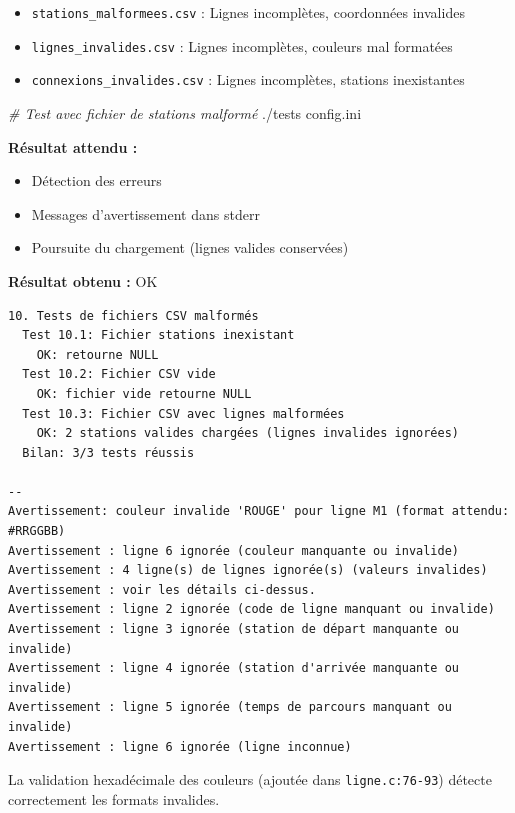\documentclass[
]{article}
\newcommand{\OK}{OK~\twemoji{white_check_mark}}
\newcommand{\OK}{OK~\twemoji{white_check_mark}}
\newenvironment{Shaded}{}{}
\newcommand{\CommentTok}[1]{\textcolor[rgb]{0.38,0.63,0.69}{\textit{#1}}}
\newcommand{\ExtensionTok}[1]{#1}
\newcommand{\NormalTok}[1]{#1}
\providecommand{\tightlist}{%
  \setlength{\itemsep}{0pt}\setlength{\parskip}{0pt}}
\begin{document}
\begin{itemize}
\tightlist
\item
  \texttt{stations\_malformees.csv} : Lignes incomplètes, coordonnées
  invalides
\item
  \texttt{lignes\_invalides.csv} : Lignes incomplètes, couleurs mal
  formatées
\item
  \texttt{connexions\_invalides.csv} : Lignes incomplètes, stations
  inexistantes
\end{itemize}

\begin{Shaded}
\begin{Highlighting}[]
\CommentTok{\# Test avec fichier de stations malformé}
\ExtensionTok{./tests}\NormalTok{ config.ini}
\end{Highlighting}
\end{Shaded}

\textbf{Résultat attendu :}

\begin{itemize}
\tightlist
\item
  Détection des erreurs
\item
  Messages d'avertissement dans stderr
\item
  Poursuite du chargement (lignes valides conservées)
\end{itemize}

\textbf{Résultat obtenu :} \OK

\begin{verbatim}
10. Tests de fichiers CSV malformés
  Test 10.1: Fichier stations inexistant
    OK: retourne NULL
  Test 10.2: Fichier CSV vide
    OK: fichier vide retourne NULL
  Test 10.3: Fichier CSV avec lignes malformées
    OK: 2 stations valides chargées (lignes invalides ignorées)
  Bilan: 3/3 tests réussis

--
Avertissement: couleur invalide 'ROUGE' pour ligne M1 (format attendu: #RRGGBB)
Avertissement : ligne 6 ignorée (couleur manquante ou invalide)
Avertissement : 4 ligne(s) de lignes ignorée(s) (valeurs invalides)
Avertissement : voir les détails ci-dessus.
Avertissement : ligne 2 ignorée (code de ligne manquant ou invalide)
Avertissement : ligne 3 ignorée (station de départ manquante ou invalide)
Avertissement : ligne 4 ignorée (station d'arrivée manquante ou invalide)
Avertissement : ligne 5 ignorée (temps de parcours manquant ou invalide)
Avertissement : ligne 6 ignorée (ligne inconnue)
\end{verbatim}

La validation hexadécimale des couleurs (ajoutée dans
\texttt{ligne.c:76-93}) détecte correctement les formats invalides.
\end{document}
